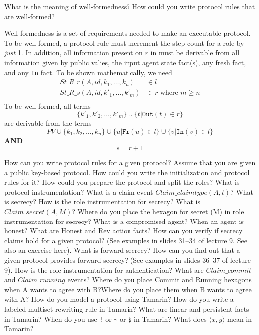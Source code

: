 \begin{questions}
\question{} What is the meaning of well-formedness? How could you write protocol rules that are well-formed?
  \begin{solution}
    Well-formedness is a set of requirements needed to make an executable protocol.
    To be well-formed, a protocol rule must increment the step count for a role by \emph{just} 1.
    In addition, all information present on $r$ in  must be derivable from all information given by public valies, the input agent state fact(s), any fresh fact, and any \texttt{In} fact.
    To be shown mathematically, we need
    \begin{align*}
      St\_R\_r(A, id, k_{1}, \ldots, k_{n}) &\in l \\
      St\_R\_s(A, id, k'_{1}, \ldots, k'_{m}) &\in r \text{ where } m \geq n \\
    \end{align*}
    To be well-formed, all terms
    \begin{equation*}
      \lbrace k'_{1}, k'_{2}, \ldots, k'_{m} \rbrace \cup \lbrace t \vert \mathtt{Out}(t) \in r \rbrace
    \end{equation*}
    are derivable from the terms
    \begin{equation*}
      PV \cup \lbrace k_{1}, k_{2}, \ldots, k_{n} \rbrace \cup \lbrace u \vert \mathtt{Fr}(u) \in l \rbrace \cup \lbrace v \vert \mathtt{In}(v) \in l \rbrace
    \end{equation*}
    \textbf{AND}
    \begin{equation*}
      s = r+1
    \end{equation*}
  \end{solution}

\question{} How can you write protocol rules for a given protocol?
\question{} Assume that you are given a public key-based protocol. How could you write the initialization and protocol rules for it? How could you prepare the protocol and split the roles?
\question{} What is protocol instrumentation? What is a claim event $Claim\_claimtype(A,t)$?
\question{} What is secrecy?
\question{} How is the role instrumentation for secrecy? What is $Claim\_secret(A,M)$? Where do you place the hexagon for secret (M) in role instrumentation for secrecy?
\question{} What is a compromised agent? When an agent is honest? What are Honest and Rev action facts?
\question{} How can you verify if secrecy claims hold for a given protocol? (See examples in slides 31--34 of lecture 9. See also an exercise here).
\question{} What is forward secrecy?
\question{} How can you find out that a given protocol provides forward secrecy? (See examples in slides 36--37 of lecture 9).
\question{} How is the role instrumentation for authentication? What are $Claim\_commit$ and $Claim\_running$ events? Where do you place Commit and Running hexagons when A wants to agree with B?\@ Where do you place them when B wants to agree with A?\@
\question{} How do you model a protocol using Tamarin? How do you write a labeled multiset-rewriting rule in Tamarin?
\question{} What are linear and persistent facts in Tamarin? When do you use \texttt{!} or \texttt{\textasciitilde{}} or \texttt{\$} in Tamarin?
\question{} What does $\langle x, y \rangle$ mean in Tamarin?
\end{questions}
